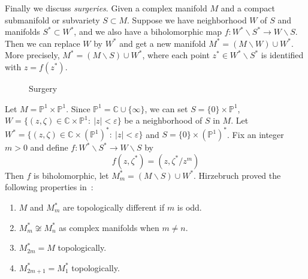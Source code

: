 Finally we discuss \emph{surgeries}.
Given a complex manifold $M$ and a compact submanifold or subvariety $S\subset M$.
Suppose we have neighborhood $W$ of $S$ and manifolds $S^*\subset W^*$, and we also have a biholomorphic map $f:W^*\backslash S^*\to W\backslash S$.
Then we can replace $W$ by $W^*$ and get a new manifold $M^*=(M\backslash W)\cup W^*$.
More precisely, $M^*=(M\backslash S)\cup W^*$, where each point $z^*\in W^*\backslash S^*$ is identified with $z=f(z^*)$.

\begin{figure}[H]
    \centering
    
    \caption{Surgery}
\end{figure}

\begin{eg}[Hirzebruch]
    Let $M=\mathbb{P}^1\times\mathbb{P}^1$.
    Since $\mathbb{P}^1=\mathbb{C}\cup\{\infty\}$, we can set $S=\{0\}\times\mathbb{P}^1$, $W=\{(z,\zeta)\in\mathbb{C}\times\mathbb{P}^1:\ |z|<\varepsilon\}$ be a neighborhood of $S$ in $M$.
    Let $W^*=\{(z,\zeta)\in\mathbb{C}\times(\mathbb{P}^1)^*:\ |z|<\varepsilon\}$ and $S=\{0\}\times(\mathbb{P}^1)^*$.
    Fix an integer $m>0$ and define $f:W^*\backslash S^*\to W\backslash S$ by
    \[f(z,\zeta^*)=(z,\zeta^*/z^m)\]
    Then $f$ is biholomorphic, let $M_m^*=(M\backslash S)\cup W^*$.
    Hirzebruch proved the following properties in~\cite{Hirzebruch51}:
    \begin{enumerate}
        \item $M$ and $M_m^*$ are topologically different if $m$ is odd.
        \item $M_m^*\not\cong M_n^*$ as complex manifolds when $m\neq n$.
        \item $M^*_{2m}=M$ topologically.
        \item $M^*_{2m+1}=M^*_1$ topologically.
    \end{enumerate}
\end{eg}

